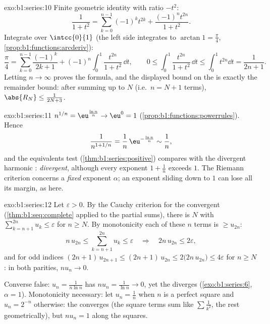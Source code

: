 \begin{solution}{exo:b1:series:10}
Finite geometric identity with ratio $-t^2$:
\[
\frac{1}{1 + t^2} = \sum_{k=0}^{n-1} (-1)^k t^{2k}
+ \frac{(-1)^n t^{2n}}{1 + t^2} .
\]
Integrate over $\intcc{0}{1}$ (the left side integrates to $\arctan
1 = \frac\pi4$, \cref{prop:b1:functions:arcderiv}):
\[
\frac{\pi}{4} = \sum_{k=0}^{n-1} \frac{(-1)^k}{2k+1}
+ (-1)^n \int_0^1 \frac{t^{2n}}{1+t^2}\,\dd t,
\qquad
0 \leq \int_0^1 \frac{t^{2n}}{1+t^2}\,\dd t \leq \int_0^1 t^{2n}\dd
t = \frac{1}{2n+1} .
\]
Letting $n \to \infty$ proves the formula, and the displayed bound
on the  is exactly the remainder bound: after summing up to
$N$ (i.e.\ $n = N + 1$ terms), $\abs{R_N} \leq \frac{1}{2N + 3}$.
\end{solution}

\begin{solution}{exo:b1:series:11}
$n^{1/n} = \eu^{\frac{\ln n}{n}} \to \eu^0 = 1$
(\cref{prop:b1:functions:powerrules}). Hence
\[
\frac{1}{n^{1 + 1/n}} = \frac{1}{n}\,\eu^{-\frac{\ln n}{n}}
\sim \frac{1}{n} ,
\]
and the equivalents test (\cref{thm:b1:series:positive})
compares with the divergent harmonic : \emph{divergent},
although every exponent $1 + \frac1n$ exceeds $1$. The Riemann
criterion concerns a \emph{fixed} exponent $\alpha$; an exponent
sliding down to $1$ can lose all its margin, as here.
\end{solution}

\begin{solution}{exo:b1:series:12}
Let $\varepsilon > 0$. By the Cauchy criterion for the
convergent  (\cref{thm:b1:seq:complete} applied to the
partial sums), there is $N$ with $\sum_{k=n+1}^{2n} u_k \leq
\varepsilon$ for $n \geq N$. By monotonicity each of these $n$
terms is $\geq u_{2n}$:
\[
n\,u_{2n} \leq \sum_{k=n+1}^{2n} u_k \leq \varepsilon
\quad\Longrightarrow\quad 2n\,u_{2n} \leq 2\varepsilon ,
\]
and for odd indices $(2n+1)\,u_{2n+1} \leq (2n+1)\,u_{2n} \leq
2\bigl(2n\,u_{2n}\bigr) \leq 4\varepsilon$ for $n \geq N$: in
both parities, $n u_n \to 0$.

Converse false: $u_n = \frac{1}{n\ln n}$ has $n u_n =
\frac{1}{\ln n} \to 0$, yet the  diverges
(\cref{exo:b1:series:6}, $\alpha = 1$). Monotonicity necessary:
let $u_n = \frac1n$ when $n$ is a perfect square and $u_n =
2^{-n}$ otherwise: the  converges (the square terms sum
like $\sum \frac{1}{k^2}$, the rest geometrically), but $n u_n =
1$ along the squares.
\end{solution}

